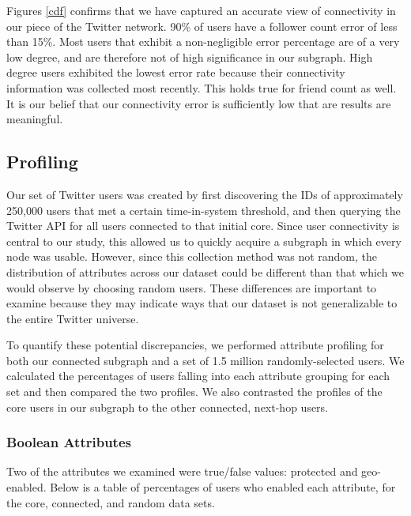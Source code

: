 Figures \ref{cdf} confirms that we have captured an accurate view of connectivity in our piece of the Twitter network.  90\% of users have a follower count error of less than 15\%.  Most users that exhibit a non-negligible error percentage are of a very low degree, and are therefore not of high significance in our subgraph.  High degree users exhibited the lowest error rate because their connectivity information was collected most recently.  This holds true for friend count as well.  It is our belief that our connectivity error is sufficiently low that are results are meaningful.

\subsection{Profiling}

Our set of Twitter users was created by first discovering the IDs of approximately 250,000 users that met a certain time-in-system threshold, and then querying the Twitter API for all users connected to that initial core.  Since user connectivity is central to our study, this allowed us to quickly acquire a subgraph in which every node was usable.  However, since this collection method was not random, the distribution of attributes across our dataset could be different than that which we would observe by choosing random users.  These differences are important to examine because they may indicate ways that our dataset is not generalizable to the entire Twitter universe.

To quantify these potential discrepancies, we performed attribute profiling for both our connected subgraph and a set of 1.5 million randomly-selected users.  We calculated the percentages of users falling into each attribute grouping for each set and then compared the two profiles.  We also contrasted the profiles of the core users in our subgraph to the other connected, next-hop users.

\subsubsection{Boolean Attributes}

Two of the attributes we examined were true/false values: protected and geo-enabled.  Below is a table of percentages of users who enabled each attribute, for the core, connected, and random data sets.

